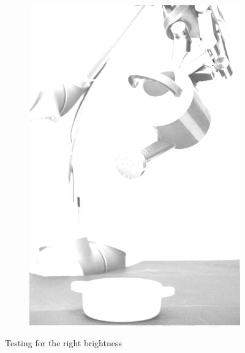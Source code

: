 \begin{figure}[H]
\begin{subfigure}[b]{0.1\textwidth}
        \includegraphics[width=\textwidth]{img3/test/contrast_5_1_9_final_img3.png}
    \end{subfigure}
    \caption{Testing for the right brightness}
    \label{fig:img3_test_brightness}
\end{figure} 

